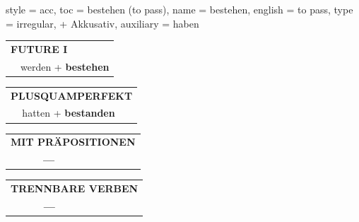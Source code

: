 \begin{verbentry}{
  style = {acc},
  toc = {bestehen (to pass)},
  name = {bestehen},
  english = {to pass},
  type = {irregular, + Akkusativ},
  auxiliary = {haben}
}
\begin{tabular}{rl}
    \multicolumn{2}{l}{\textbf{FUTURE I} }\\
  &  werden + \textbf{bestehen}\\
 
  \end{tabular}
\hfill
   \begin{tabular}{rl}
      \multicolumn{2}{l}{\textbf{PLUSQUAMPERFEKT}}\\
   & hatten + \textbf{bestanden}\\
  \end{tabular}
  
 \vspace{10pt}

\begin{tabular}{lll}
\multicolumn{3}{l}{\textbf{MIT PRÄPOSITIONEN}}\\
& \textbf{---} & \\
\end{tabular}
\hfill
\begin{tabular}{lll}
\multicolumn{3}{l}{\textbf{TRENNBARE VERBEN}}\\
& \textbf{---} & \\
\end{tabular}

\vspace{-5pt}
\end{verbentry}


